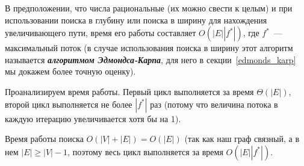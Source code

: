 \begin{comment}
\draw (195,107.4) node [anchor=north west][inner sep=0.75pt]    {$v_{1}$};
\draw (366,28.4) node [anchor=north west][inner sep=0.75pt]    {$s$};
\draw (367,177.4) node [anchor=north west][inner sep=0.75pt]    {$t$};
\draw (303,105.4) node [anchor=north west][inner sep=0.75pt]    {$v_{2}$};
\draw (413,104.4) node [anchor=north west][inner sep=0.75pt]    {$v_{3}$};
\draw (518,104.4) node [anchor=north west][inner sep=0.75pt]    {$v_{4}$};
\draw (333,59.4) node [anchor=north west][inner sep=0.75pt]    {$3$};
\draw (264,45.4) node [anchor=north west][inner sep=0.75pt]    {$3$};
\draw (462,45.4) node [anchor=north west][inner sep=0.75pt]    {$3$};
\draw (254,93.4) node [anchor=north west][inner sep=0.75pt]    {$1$};
\draw (359,92.4) node [anchor=north west][inner sep=0.75pt]    {$1$};
\draw (454,145.4) node [anchor=north west][inner sep=0.75pt]    {$3$};
\draw (378,132.4) node [anchor=north west][inner sep=0.75pt]    {$3$};
\draw (266,163.4) node [anchor=north west][inner sep=0.75pt]    {$3$};
\draw (445,88.4) node [anchor=north west][inner sep=0.75pt]    {$c=\frac{\sqrt{5} -1}{2}$};
\end{tikzpicture}
\end{center}

Величина максимального потока в этой сети равна $7=2\cdot3+1$ (на ребрах $s\to v_1\to t$ и $s\to v_4\to t$ его значение 3, на ребрах $s\to v_2\to v_3\to t$ его значение 1).
\end{example}
\end{comment}

В предположении, что числа рациональные (их можно свести к целым) и при использовании поиска в глубину или поиска в ширину для нахождения увеличивающего пути, время его работы составляет $O(|E||f^*|)$, где $f^*$~--- максимальный поток (в случае использования поиска в ширину этот алгоритм называется {\bf\it алгоритмом Эдмондса-Карпа}, для него в секции~\ref{edmonds_karp} мы докажем более точную оценку).

Проанализируем время работы. Первый цикл выполняется за время $\Theta(|E|)$, второй цикл выполняется не более $|f^*|$ раз (потому что величина потока в каждую итерацию увеличивается хотя бы на 1).

Время работы поиска $O(|V|+|E|)=O(|E|)$ (так как наш граф связный, а в нем $|E|\ge |V|-1$, поэтому весь цикл выполняется за время $O(|E||f^*|)$.

